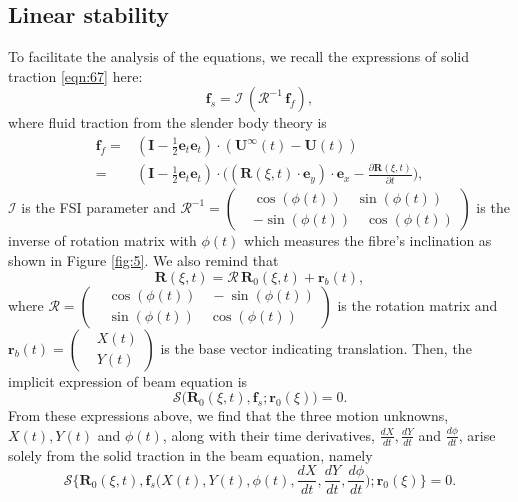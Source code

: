 \documentclass[lineno]{JFM-FLM_Au}
\begin{document}
\subsection{Linear stability}
To facilitate the analysis of the equations, we recall the expressions of solid traction \eqref{eqn:67} here:
\begin{equation}
	\label{eqn:104}
	\mathbf{f}_s=\mathcal{I}\,\left(\mathbf{\mathcal{R}}^{-1}\,\mathbf{f}_f\right),
\end{equation}
where fluid traction from the slender body theory is 
\begin{equation}
	\label{eqn:105}
	\begin{aligned}
		\mathbf{f}_f=&\left(\mathbf{I}-\frac{1}{2}\mathbf{e}_t\mathbf{e}_t\right)\cdot(\mathbf{U}^{\infty}(t)-\mathbf{U}(t))\\
		=&\left(\mathbf{I}-\frac{1}{2}\mathbf{e}_t\mathbf{e}_t\right)\cdot\Big((\mathbf{\mathbf{R}}(\xi,t)\cdot\mathbf{e}_y)\cdot\mathbf{e}_x-\frac{\partial\mathbf{R}(\xi,t)}{\partial t}\Big),
	\end{aligned}
\end{equation}
$\mathcal{I}$ is the FSI parameter and  $\mathbf{\mathcal{R}}^{-1}=\left(\begin{aligned}
	&\cos(\phi(t))\quad \sin(\phi(t)) \\
	&-\sin(\phi(t))\quad \cos(\phi(t))
\end{aligned}\right)$ is the inverse of rotation matrix with $\phi(t)$ which measures the fibre's inclination as shown in Figure \ref{fig:5}. We also remind that 
\begin{equation}
	\mathbf{R}(\xi,t)=\mathbf{\mathcal{R}}\,\mathbf{R}_0(\xi,t)+\mathbf{r}_b(t),
\end{equation}
where $\mathbf{\mathcal{R}}=\left(\begin{aligned}
	&\cos(\phi(t))\quad -\sin(\phi(t)) \\
	&\sin(\phi(t))\quad \cos(\phi(t))
\end{aligned}\right)$ is the rotation matrix and $\mathbf{r}_b(t)=\left(\begin{aligned}
	&X(t) \\
	&Y(t)
\end{aligned}\right)$ is the base vector indicating translation.
Then, the implicit expression of beam equation is 
\begin{equation}
	\label{eqn:106}
	\mathbf{\mathcal{S}}\Big(\mathbf{R}_0(\xi,t),\mathbf{f}_s;\mathbf{r}_0(\xi)\Big)=0.
\end{equation}
From these expressions above, we find that the three motion unknowns, $X(t), Y(t)$ and $\phi(t)$, along with their time derivatives,  $\frac{dX}{dt}, \frac{dY}{dt}$ and $\frac{d\phi}{dt}$, arise solely from the solid traction in the beam equation, namely 	
\begin{equation}
	\label{eqn:107}
	\mathbf{\mathcal{S}}\Big\{\mathbf{R}_0(\xi,t),\mathbf{f}_s\Big(X(t), Y(t),\phi(t),\frac{dX}{dt}, \frac{dY}{dt},\frac{d\phi}{dt}\Big);\mathbf{r}_0(\xi)\Big\}=0.
\end{equation}
\end{document}
